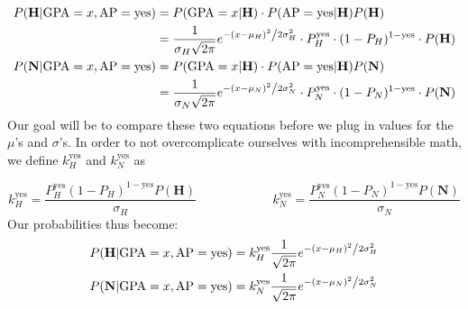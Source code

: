 \documentclass{article}
\begin{document}
\begin{align*}
P(\mathbf{H} | \text{GPA}=x, \text{AP}=\text{yes}) &= P(\text{GPA} = x | \mathbf{H}) \cdot  P(\text{AP} = \text{yes} | \mathbf{H}) P(\mathbf{H})\\
&= \frac{1}{{\sigma_{H} \sqrt {2\pi } }}e^{{{ - \left( {x - \mu_H } \right)^2 } \mathord{\left/ {\vphantom {{ - \left( {x - \mu_H } \right)^2 } {2\sigma_{H} ^2 }}} \right. \kern-\nulldelimiterspace} {2\sigma_{H} ^2 }}} \cdot  P_H^{\text{yes}}\cdot (1-P_H)^{1-\text{yes}} \cdot  P(\mathbf{H})\\
P(\mathbf{N} | \text{GPA}=x, \text{AP}=\text{yes}) &= P(\text{GPA} = x | \mathbf{H}) \cdot  P(\text{AP} = \text{yes} | \mathbf{H}) P(\mathbf{N})\\
&= \frac{1}{{\sigma_{N} \sqrt {2\pi } }}e^{{{ - \left( {x - \mu_N } \right)^2 } \mathord{\left/ {\vphantom {{ - \left( {x - \mu_N } \right)^2 } {2\sigma_{N} ^2 }}} \right. \kern-\nulldelimiterspace} {2\sigma_{N} ^2 }}} \cdot  P_N^{\text{yes}}\cdot (1-P_N)^{1-\text{yes}} \cdot  P(\mathbf{N})
\end{align*}
Our goal will be to compare these two equations before we plug in values for the $\mu$'s and $\sigma$'s. In order to not overcomplicate ourselves with incomprehensible math, we define $k_H^\text{yes}$ and $k_N^\text{yes}$ as

\[
k_H^\text{yes}=\frac{P_H^{\text{yes}} (1-P_H)^{1-\text{yes}}  P(\mathbf{H})}{{\sigma_{H} }} \qquad \qquad\qquad k_N^\text{yes}=\frac{P_N^{\text{yes}} (1-P_N)^{1-\text{yes}}  P(\mathbf{N})}{{\sigma_{N} }} 
\]
Our probabilities thus become:
\begin{align*}
P(\mathbf{H} | \text{GPA}=x, \text{AP}=\text{yes}) &=  k_H^\text{yes} \frac{1}{{\sqrt {2\pi } }}e^{{{ - \left( {x - \mu_H } \right)^2 } \mathord{\left/ {\vphantom {{ - \left( {x - \mu_H } \right)^2 } {2\sigma_{H} ^2 }}} \right. \kern-\nulldelimiterspace} {2\sigma_{H} ^2 }}}\\
P(\mathbf{N} | \text{GPA}=x, \text{AP}=\text{yes}) &= k_N^\text{yes}\frac{1}{{ \sqrt {2\pi } }}e^{{{ - \left( {x - \mu_N } \right)^2 } \mathord{\left/ {\vphantom {{ - \left( {x - \mu_N } \right)^2 } {2\sigma_{N} ^2 }}} \right. \kern-\nulldelimiterspace} {2\sigma_{N} ^2 }}} 
\end{align*}

%
%
\end{document}
